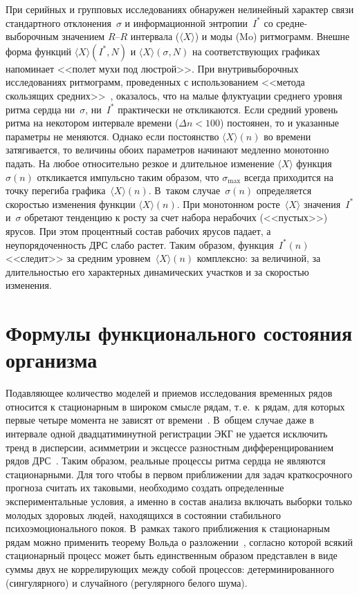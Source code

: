 \begin{multicols}{2}
  При серийных и групповых исследованиях обнаружен нелинейный характер 
связи стандартного отклонения~$\sigma$ и информационной энтропии~$I^*$ 
со сред\-не-вы\-бо\-роч\-ным значением $R$--$R$ интервала ($\langle X\rangle$) 
и моды (Mo) ритмограмм. Внешне форма функций $\langle X\rangle(I^*, N)$ и 
$\langle X\rangle(\sigma, N)$ на соответствующих графиках напоминает <<полет 
мухи под люстрой>>. При внутривыборочных исследованиях ритмограмм, 
проведенных с использованием <<метода скользящих средних>>~\cite{6ku}, 
оказалось, что на малые флуктуации среднего уровня ритма сердца 
ни~$\sigma$, ни~$I^*$ практически не откликаются. Если средний уровень 
ритма на некотором интервале времени ($\Delta n < 100$) постоянен, то и 
указанные параметры не меняются. Однако если постоянство $\langle 
X\rangle(n)$ во времени затягивается, то величины обоих параметров начинают 
медленно монотонно падать. На любое относительно резкое и длительное 
изменение $\langle X\rangle$ функция~$\sigma(n)$ откликается импульсно 
таким образом, что $\sigma_{\max}$ всегда приходится на точку перегиба 
графика~$\langle X\rangle(n)$. В~таком случае~$\sigma(n)$ определяется 
скоростью изменения функции $\langle X\rangle (n)$. При монотонном 
росте~$\langle X\rangle$ значения~$I^*$ и~$\sigma$ обретают тенденцию к 
росту за счет набора нерабочих (<<пустых>>) ярусов. При этом процентный 
состав рабочих ярусов падает, а неупорядоченность ДРС слабо растет. Таким 
образом, функция~$I^*(n)$ <<следит>> за средним уровнем~$\langle X\rangle 
(n)$ комплексно: за величиной, за длительностью его характерных 
динамических участков и за скоростью изменения. 
  

\section{Формулы функционального состояния организма}

    Подавляющее количество моделей и приемов исследования временных 
рядов относится к стационарным в широком смысле рядам, т.\,е.\ к рядам, для 
которых первые четыре момента не зависят от времени~\cite{21ku, 22ku}. 
В~общем случае даже в интервале одной двадцатиминутной регистрации ЭКГ 
не удается исключить тренд в дисперсии, асимметрии и эксцессе разностным 
дифференцированием рядов ДРС~\cite{6ku, 21ku}. Таким образом, реальные 
процессы ритма сердца не являются стационарными. Для того чтобы в первом 
приближении для задач краткосрочного прогноза считать их таковыми, 
необходимо создать определенные экспериментальные условия, а именно в 
состав анализа включать выборки только молодых здоровых людей, 
находящихся в состоянии стабильного психоэмоционального покоя. В~рамках 
такого приближения к стационарным рядам можно применить теорему Вольда 
о разложении~\cite{23ku}, согласно которой всякий стационарный процесс 
может быть единственным образом представлен в виде суммы двух не 
кор\-ре\-ли\-ру\-ющих между собой процессов: детерминированного (сингулярного) 
и случайного (регулярного белого шума). 


\end{multicols}
